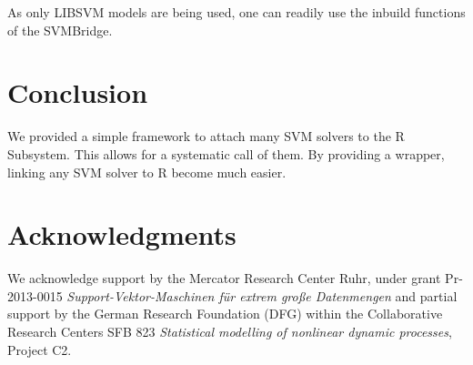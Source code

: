 \documentclass[article, shortnames]{jss}
\begin{document}
As only LIBSVM models are being used, one can readily use the 
inbuild functions of the SVMBridge. 


\section{Conclusion}

We provided a simple framework to attach many SVM solvers to the R Subsystem.
This allows for a systematic call of them.
By providing a wrapper, linking any SVM solver to R become much easier.



\section*{Acknowledgments}

We acknowledge support by the Mercator Research Center Ruhr,
under grant Pr-2013-0015 \textit{Support-Vektor-Maschinen f{\"u}r extrem gro{\ss}e Datenmengen} and
partial support by the German Research Foundation (DFG) within the Collaborative Research Centers SFB 823
\textit{Statistical modelling of nonlinear dynamic processes}, Project C2.



\end{document}
